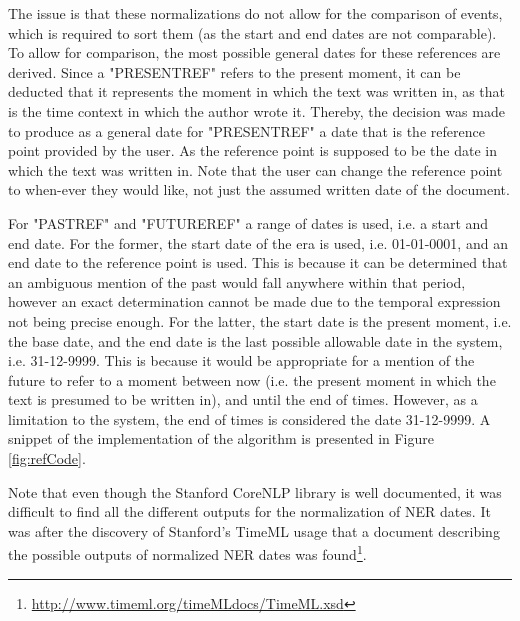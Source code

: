 \par The issue is that these normalizations do not allow for the comparison of events, which is required to sort them (as the start and end dates are not comparable). To allow for comparison, the most possible general dates for these references are derived. Since a "PRESENT\textunderscore REF" refers to the present moment, it can be deducted that it represents the moment in which the text was written in, as that is the time context in which the author wrote it. Thereby, the decision was made to produce as a general date for "PRESENT\textunderscore REF" a date that is the reference point provided by the user. As the reference point is supposed to be the date in which the text was written in. Note that the user can change the reference point to when-ever they would like, not just the assumed written date of the document. 

\par For "PAST\textunderscore REF" and "FUTURE\textunderscore REF" a range of dates is used, i.e. a start and end date. For the former, the start date of the era is used, i.e. 01-01-0001, and an end date to the reference point is used. This is because it can be determined that an ambiguous mention of the past would fall anywhere within that period, however an exact determination cannot be made due to the temporal expression not being precise enough. For the latter, the start date is the present moment, i.e. the base date, and the end date is the last possible allowable date in the system, i.e. 31-12-9999. This is because it would be appropriate for a mention of the future to refer to a moment between now (i.e. the present moment in which the text is presumed to be written in), and until the end of times. However, as a limitation to the system, the end of times is considered the date 31-12-9999. A snippet of the implementation of the algorithm is presented in Figure \ref{fig:refCode}.

\par Note that even though the Stanford CoreNLP library is well documented, it was difficult to find all the different outputs for the normalization of NER dates. It was after the discovery of Stanford's TimeML usage that a document describing the possible outputs of normalized NER dates was found\footnote{\url{http://www.timeml.org/timeMLdocs/TimeML.xsd}}. 

